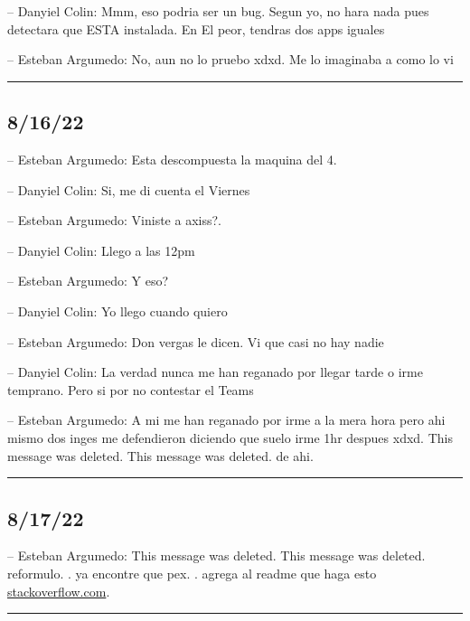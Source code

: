-- Danyiel Colin: Mmm, eso podria ser un bug. Segun yo, no hara nada
pues detectara que ESTA instalada. En El peor, tendras dos apps iguales

-- Esteban Argumedo: No, aun no lo pruebo xdxd. Me lo imaginaba a como
lo vi

\begin{center}\rule{0.5\linewidth}{0.5pt}\end{center}

\hypertarget{section-145}{%
\subsection{8/16/22}\label{section-145}}

-- Esteban Argumedo: Esta descompuesta la maquina del 4.

-- Danyiel Colin: Si, me di cuenta el Viernes

-- Esteban Argumedo: Viniste a axiss?.

-- Danyiel Colin: Llego a las 12pm

-- Esteban Argumedo: Y eso?

-- Danyiel Colin: Yo llego cuando quiero

-- Esteban Argumedo: Don vergas le dicen. Vi que casi no hay nadie

-- Danyiel Colin: La verdad nunca me han reganado por llegar tarde o
irme temprano. Pero si por no contestar el Teams

-- Esteban Argumedo: A mi me han reganado por irme a la mera hora pero
ahi mismo dos inges me defendieron diciendo que suelo irme 1hr despues
xdxd. This message was deleted. This message was deleted. de ahi.

\begin{center}\rule{0.5\linewidth}{0.5pt}\end{center}

\hypertarget{section-146}{%
\subsection{8/17/22}\label{section-146}}

-- Esteban Argumedo: This message was deleted. This message was deleted.
reformulo. . ya encontre que pex. . agrega al readme que haga esto
\href{https://stackoverflow.com/questions/64633727/how-to-fix-running-scripts-is-disabled-on-this-system}{stackoverflow.com}.

\begin{center}\rule{0.5\linewidth}{0.5pt}\end{center}

